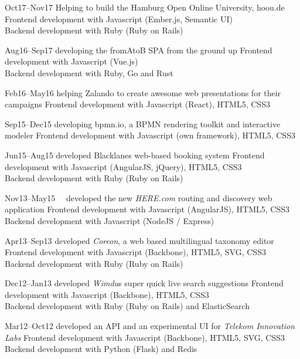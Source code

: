\documentclass[]{friggeri-cv}
\begin{document}
\begin{entrylist}
  \entry
    {Oct17–Nov17}
    {Helping to build the Hamburg Open Online University, hoou.de}
    {}
    {Frontend development with Javascript (Ember.js, Semantic UI)\\
     Backend development with Ruby (Ruby on Rails)}

  \entry
    {Aug16–Sep17}
    {developing the fromAtoB SPA from the ground up}
    {}
    {Frontend development with Javascript (Vue.js)\\
     Backend development with Ruby, Go and Rust}

  \entry
    {Feb16–May16}
    {helping Zalando to create awesome web presentations for their campaigns}
    {}
    {Frontend development with Javascript (React), HTML5, CSS3}

  \entry
    {Sep15–Dec15}
    {developing bpmn.io, a BPMN rendering toolkit and interactive modeler}
    {}
    {Frontend development with Javascript (own framework), HTML5, CSS3}

  \entry
    {Jun15–Aug15}
    {developed Blacklanes web-based booking system}
    {}
    {Frontend development with Javascript (AngularJS, jQuery), HTML5, CSS3\\
     Backend development with Ruby (Ruby on Rails)}

  \entry
    {Nov13–May15~~}
    {developed the new \emph{HERE.com} routing and discovery web application}
    {}
    {Frontend development with Javascript (AngularJS), HTML5, CSS3\\
     Backend development with Javascript (NodeJS / Express)}

  \entry
    {Apr13–Sep13}
    {developed \emph{Coreon}, a web based multilingual taxonomy editor}
    {}
    {Frontend development with Javascript (Backbone), HTML5, SVG, CSS3\\
     Backend development with Ruby (Ruby on Rails)}

  \entry
    {Dec12–Jan13}
    {developed \emph{Wimdu}s super quick live search suggestions}
    {}
    {Frontend development with Javascript (Backbone), HTML5, CSS3\\
     Backend development with Ruby (Ruby on Rails) and ElasticSearch}

  \entry
    {Mar12–Oct12}
    {developed an API and an experimental UI for \emph{Telekom Innovation Labs}}
    {}
    {Frontend development with Javascript (Backbone), HTML5, SVG, CSS3\\
     Backend development with Python (Flask) and Redis}


\end{entrylist}
\end{document}
